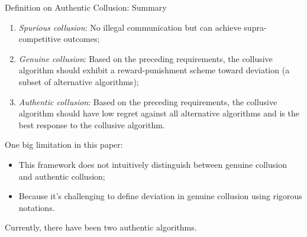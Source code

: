 \documentclass[8pt]{beamer}
\begin{document}
\begin{frame}{Definition on Authentic Collusion: Summary}
    \begin{enumerate}
        \item \textit{Spurious collusion}: No illegal communication but can achieve supra-competitive outcomes;
        \item \textit{Genuine collusion}: Based on the preceding requirements, the collusive algorithm should exhibit a reward-punishment scheme toward deviation (a subset of alternative algorithms);
        \item \textit{Authentic collusion}: Based on the preceding requirements, the collusive algorithm should have low regret against all alternative algorithms and is the best response to the collusive algorithm.
    \end{enumerate}
    \vspace{0.3cm}
    One big limitation in this paper:
    \begin{itemize}
        \item This framework does not intuitively distinguish between genuine collusion and authentic collusion; 
        \item Because it's challenging to define deviation in genuine collusion using rigorous notations.
    \end{itemize}
    \vspace{0.3cm}
    \begin{center}
        Currently, there have been two authentic algorithms.
    \end{center}
\end{frame}
\end{document}
